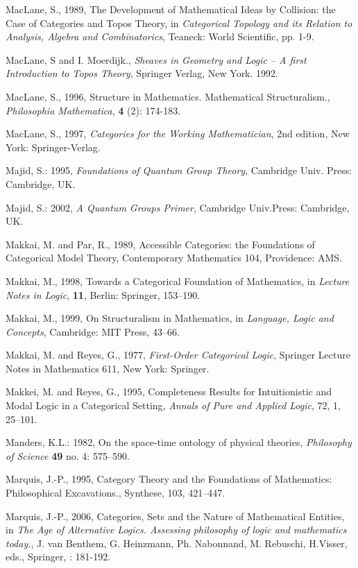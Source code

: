 \documentclass[12pt]{article}
\theoremstyle{plain}
\theoremstyle{definition}
\numberwithin{equation}{section}
\begin{document}
\begin{thebibliography}{9}
MacLane, S., 1989, The Development of Mathematical Ideas by Collision: the Case of Categories and Topos Theory, in 
{\em Categorical Topology and its Relation to Analysis, Algebra and Combinatorics}, Teaneck: World Scientific, pp. 1-9.

MacLane, S and I. Moerdijk., \emph{Sheaves in Geometry and Logic -- A first Introduction to Topos Theory}, Springer Verlag, New York. 1992. 

MacLane, S., 1996, Structure in Mathematics. Mathematical Structuralism., {\em Philosophia Mathematica},
 \textbf{4} (2): 174-183. 

MacLane, S., 1997, {\em Categories for the Working Mathematician}, 2nd edition, New York: Springer-Verlag. 

Majid, S.: 1995, \emph{Foundations of Quantum Group Theory}, Cambridge Univ. Press: Cambridge, UK.

Majid, S.: 2002, \emph{A Quantum Groups Primer}, Cambridge Univ.Press: Cambridge, UK.

Makkai, M. and Par, R., 1989, Accessible Categories: the Foundations of Categorical Model Theory, Contemporary Mathematics 104, Providence: AMS. 

Makkai, M., 1998, Towards a Categorical Foundation of Mathematics, in {\em Lecture Notes in Logic}, \textbf{11}, Berlin: Springer, 153--190. 

Makkai, M., 1999, On Structuralism in Mathematics, 
in {\em Language, Logic and Concepts}, Cambridge: MIT Press, 43--66. 

Makkai, M. and Reyes, G., 1977, {\em First-Order Categorical Logic}, Springer Lecture Notes in Mathematics 611, New York: Springer. 

Makkei, M. and Reyes, G., 1995, Completeness Results for Intuitionistic and Modal Logic in a Categorical Setting, 
{\em Annals of Pure and Applied Logic}, 72, 1, 25--101. 

Manders, K.L.: 1982, On the space-time ontology of physical theories, \emph{Philosophy of Science} \textbf{49} no. 4: 575--590.

Marquis, J.-P., 1995, Category Theory and the Foundations of Mathematics: Philosophical Excavations., Synthese, 103, 421--447. 

Marquis, J.-P., 2006, Categories, Sets and the Nature of Mathematical Entities, in {\em The Age of Alternative Logics. Assessing philosophy of logic and mathematics today.}, J. van Benthem, G. Heinzmann, Ph. Nabonnand, M. Rebuschi, H.Visser, eds., Springer, : 181-192. 


\end{thebibliography}
\end{document}
